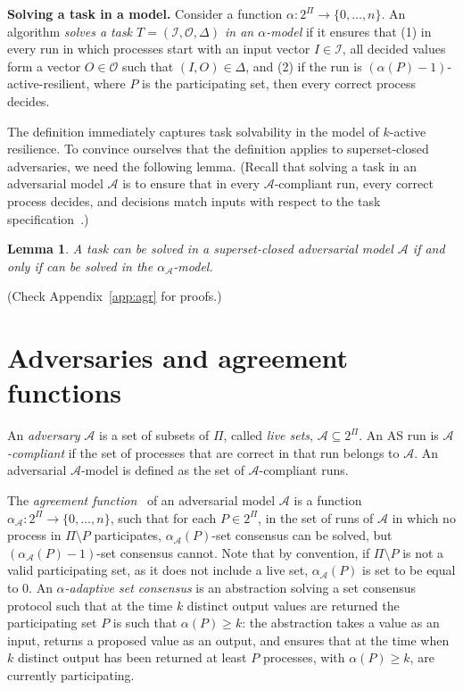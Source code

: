 \documentclass[a4paper]{article}
\newtheorem{definition}{Definition}
\newtheorem{lemma}[theorem]{Lemma}
\newcommand{\myparagraph}[1]{\vspace{6pt}\noindent \textbf{#1}}
\def\A{\ensuremath{\mathcal{A}}}
\def\I{\ensuremath{\mathcal{I}}}
\def\O{\ensuremath{\mathcal{O}}}
\def\O {\mathcal{O}}
\def\I {\mathcal{I}}
\begin{document}
{\myparagraph{Solving a task in a model.}
%
Consider a function $\alpha: 2^{\Pi} \to \{0,\ldots,n\}$.  
An algorithm \emph{solves a task $T=(\I,\O,\Delta)$ in an
  $\alpha$-model} if it ensures that (1) in every run in which
processes start with an input vector $I\in\I$, 
all decided values form a vector $O\in\O$ such that $(I,O)\in\Delta$,
and (2) if the run is $(\alpha(P)-1)$-active-resilient, where $P$ is
the participating set, then every correct process decides. 

The definition immediately captures task solvability in the model of $k$-active
resilience. 
To convince ourselves that the definition applies to superset-closed
adversaries, we need the following lemma.
(Recall that solving a task in an adversarial model $\A$ is to ensure that
in every $\A$-compliant run, every correct process decides, and
decisions match inputs with respect to the task specification~\cite{GK10,HR10,Kuz12}.) 

\begin{lemma}%
\label{lem:adv:task}
A task can be solved in a superset-closed adversarial model $\A$ if and
only if can be solved in the $\alpha_{\A}$-model.
\end{lemma}    
%
(Check Appendix~\ref{app:agr} for proofs.)
}


\section{Adversaries and agreement functions}
\label{sec:adv}

An \emph{adversary} $\A$ is a set of subsets of $\Pi$, called \emph{live sets}, $\A\subseteq 2^{\Pi}$.
%
%
An AS run is \emph{$\A$-compliant} if the set of processes that are correct in that run
belongs to $\A$. An adversarial $\A$-model is defined as the set of
$\A$-compliant runs. 

The \emph{agreement function}~\cite{KR17} of an adversarial model $\A$ is 
a function $\alpha_\A: 2^{\Pi} \to \{0,\ldots,n\}$, such that 
for each $P\in 2^{\Pi}$, in the set of runs of $\A$ in which no process
in $\Pi\setminus P$ participates,
$\alpha_\A(P)$-set consensus can be solved, 
but $(\alpha_\A(P)-1)$-set consensus cannot.
Note that by convention, if $\Pi\setminus P$ is not a
valid participating set, as it does not include a live set,
$\alpha_\A(P)$ is set to be equal to $0$.
An \emph{$\alpha$-adaptive set consensus} is 
an abstraction solving a set consensus protocol  
such that at the time $k$ distinct output values are returned
the participating set $P$ is such that $\alpha(P)\geq k$: 
the abstraction takes a value as an input, 
returns a proposed value as an output,  and ensures that at the
time when $k$ distinct output has been returned at least
$P$ processes, with $\alpha(P)\geq k$, are currently participating.   
\end{document}
